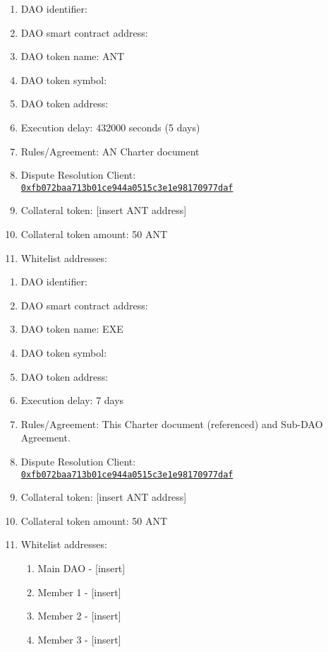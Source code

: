 
\label{chap:DAOParameters}

\begin{itemize}
	
	\begin{enumerate}[noitemsep]
		\item \ac{DAO} identifier:
		\item \ac{DAO} smart contract address:
		\item \ac{DAO} token name: \ac{ANT}
		\item \ac{DAO} token symbol:
		\item \ac{DAO} token address:
		\item Execution delay: 432000 seconds (5 days)
		\item Rules/Agreement: AN Charter document
		\item Dispute Resolution Client:\\ \href{https://etherscan.io/address/0xfb072baa713b01ce944a0515c3e1e98170977daf}{\texttt{0xfb072baa713b01ce944a0515c3e1e98170977daf}}
		\item Collateral token: [insert \ac{ANT} address]
		\item Collateral token amount: 50 \ac{ANT}
		\item Whitelist addresses:
	\end{enumerate}

	\begin{enumerate}[noitemsep]
		\item \ac{DAO} identifier:
		\item \ac{DAO} smart contract address:
		\item \ac{DAO} token name: EXE
		\item \ac{DAO} token symbol:
		\item \ac{DAO} token address:
		\item Execution delay: 7 days
		\item Rules/Agreement: This Charter document (referenced) and Sub-\ac{DAO} Agreement.
		\item Dispute Resolution Client:\\ \href{https://etherscan.io/address/0xfb072baa713b01ce944a0515c3e1e98170977daf}{\texttt{0xfb072baa713b01ce944a0515c3e1e98170977daf}}
		\item Collateral token: [insert \ac{ANT} address]
		\item Collateral token amount: 50 \ac{ANT}
		\item Whitelist addresses:
		\begin{enumerate}
			\item Main \ac{DAO} - [insert]
			\item Member 1 - [insert]
			\item Member 2 - [insert]
			\item Member 3 - [insert]
		\end{enumerate}
	

\end{enumerate}
\end{itemize}
